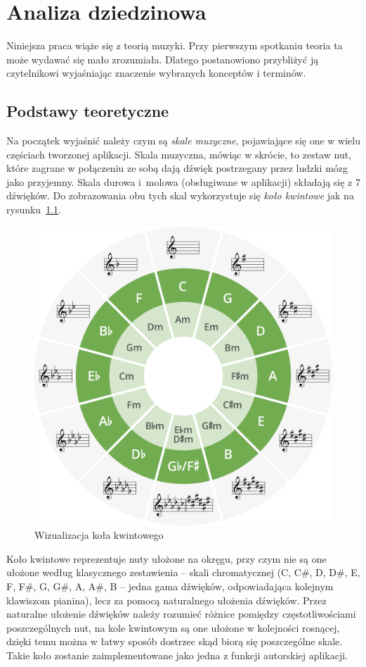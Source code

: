 \chapter{Analiza dziedzinowa}
Niniejsza praca wiąże się z teorią muzyki. Przy pierwszym spotkaniu teoria ta może wydawać się mało zrozumiała. Dlatego postanowiono przybliżyć ją czytelnikowi wyjaśniając znaczenie wybranych konceptów i terminów.
\section{Podstawy teoretyczne}
Na początek wyjaśnić należy czym są \emph{skale muzyczne}, pojawiające się one w wielu częściach tworzonej aplikacji. Skala muzyczna, mówiąc w skrócie, to zestaw nut, które zagrane w połączeniu ze sobą dają dźwięk postrzegany przez ludzki mózg jako przyjemny. Skala durowa i~molowa (obsługiwane w aplikacji) składają się z 7 dźwięków. Do zobrazowania obu tych skal wykorzystuje się \emph{koło kwintowe} jak na rysunku~\ref{fig:kolokwintowe}. 
\begin{figure}[htb]
	\centering
	\includegraphics[width=.48\linewidth]{rys02/cof2.1}
	\caption{Wizualizacja koła kwintowego} \label{fig:kolokwintowe}
\end{figure}

Koło kwintowe reprezentuje nuty ułożone na okręgu, przy czym nie są one ułożone według klasycznego zestawienia -- skali chromatycznej (C, C\#, D, D\#, E, F, F\#, G, G\#, A, A\#, B -- jedna gama dźwięków, odpowiadająca kolejnym klawiszom pianina), lecz za pomocą naturalnego ułożenia dźwięków. 
Przez naturalne ułożenie dźwięków należy rozumieć różnice pomiędzy częstotliwościami poszczególnych nut, na kole kwintowym są one ułożone w kolejności rosnącej, dzięki temu można w łatwy sposób dostrzec skąd biorą się poszczególne skale. Takie koło zostanie zaimplementowane jako jedna z funkcji autorskiej aplikacji.


